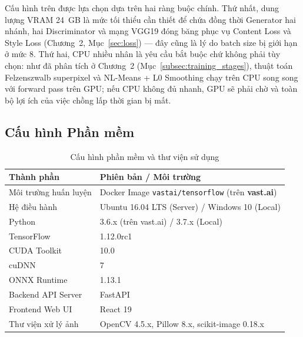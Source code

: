 
Cấu hình trên được lựa chọn dựa trên hai ràng buộc chính. Thứ nhất, dung lượng VRAM 24~GB là mức tối thiểu cần thiết để chứa đồng thời Generator hai nhánh, hai Discriminator và mạng VGG19 đóng băng phục vụ Content Loss và Style Loss (Chương~2, Mục~\ref{sec:loss}) --- đây cũng là lý do batch size bị giới hạn ở mức 8. Thứ hai, CPU nhiều nhân là yêu cầu bắt buộc chứ không phải tùy chọn: như đã phân tích ở Chương~2 (Mục~\ref{subsec:training_stages}), thuật toán Felzenszwalb superpixel và NL-Means + L0 Smoothing chạy trên CPU song song với forward pass trên GPU; nếu CPU không đủ nhanh, GPU sẽ phải chờ và toàn bộ lợi ích của việc chồng lấp thời gian bị mất.

\subsection{Cấu hình Phần mềm}
\label{subsec:software}

\begin{table}[H]
\caption{Cấu hình phần mềm và thư viện sử dụng}
\label{tab:software}
\centering
\begin{tabular}{|p{4.5cm}|p{10.5cm}|}
\hline
\textbf{Thành phần} & \textbf{Phiên bản / Môi trường} \\
\hline
Môi trường huấn luyện & Docker Image \texttt{vastai/tensorflow} (trên \textbf{vast.ai}) \\
\hline
Hệ điều hành & Ubuntu 16.04 LTS (Server) / Windows 10 (Local) \\
\hline
Python & 3.6.x (trên vast.ai) / 3.7.x (Local) \\
\hline
TensorFlow & 1.12.0rc1 \\
\hline
CUDA Toolkit & 10.0 \\
\hline
cuDNN & 7 \\
\hline
ONNX Runtime & 1.13.1 \\
\hline
Backend API Server & FastAPI \\
\hline
Frontend Web UI & React 19 \\
\hline
Thư viện xử lý ảnh & OpenCV 4.5.x, Pillow 8.x, scikit-image 0.18.x \\
\hline
\end{tabular}
\end{table}

